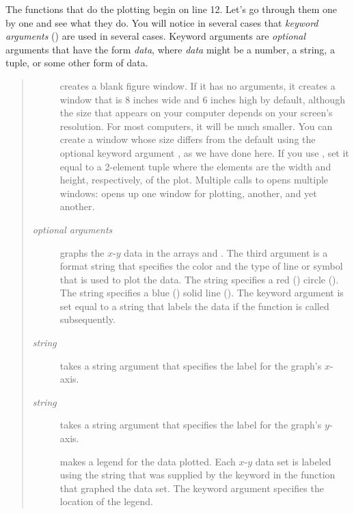\documentclass[letterpaper,10pt,english]{sphinxmanual}
\begin{document}
The functions that do the plotting begin on line 12.  Let's go through them one by one and see what they do.  You will notice in several cases that \emph{keyword arguments} () are used in several cases.  Keyword arguments are \emph{optional} arguments that have the form  \emph{data}, where \emph{data} might be a number, a string, a tuple, or some other form of data.
\begin{quote}
\begin{description}
\item[{}] \leavevmode
creates a blank figure window.  If it has no arguments, it creates a window that is 8 inches wide and 6 inches high by default, although the size that appears on your computer depends on your screen's resolution.  For most computers, it will be much smaller.  You can create a window whose size differs from the default using the optional keyword argument , as we have done here.  If you use , set it equal to a 2-element tuple where the elements are the width and height, respectively, of the plot.  Multiple calls to  opens multiple windows:   opens up one window for plotting,  another, and  yet another.

\item[{ \emph{optional arguments} \code{)}}] \leavevmode
graphs the \(x\)-\(y\) data in the arrays  and .  The third argument is a format string that specifies the color and the type of line or symbol that is used to plot the data.  The string  specifies a red () circle ().  The string  specifies a blue () solid line (\code{-}).  The keyword argument  is set equal to a string that labels the data if the  function is called subsequently.

\item[{ \emph{string} \code{)}}] \leavevmode
takes a string argument that specifies the label for the graph's \(x\)-axis.

\item[{ \emph{string} \code{)}}] \leavevmode
takes a string argument that specifies the label for the graph's \(y\)-axis.

\item[{}] \leavevmode
makes a legend for the data plotted.  Each \(x\)-\(y\) data set is labeled  using the string that was supplied by the  keyword in the  function that graphed the data set.  The  keyword argument specifies the location of the legend.


\end{description}
\end{quote}
\end{document}
